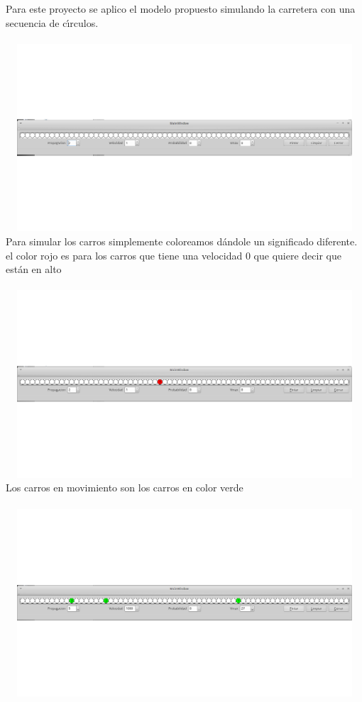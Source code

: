 \documentclass[a4paper,10pt]{article}
\begin{document}
Para este proyecto se aplico el modelo propuesto simulando la carretera con una secuencia de c\'\i rculos.
\\ \\
\includegraphics[width=15cm, height=7cm]{1}
\\
Para simular los carros simplemente coloreamos dándole un significado diferente. el color rojo es para los carros que tiene una velocidad 0 que quiere decir que est\'an en alto
\\ \\
\includegraphics[width=15cm, height=7cm]{2}
\\
Los carros en movimiento son los carros en color verde
\\ \\
\includegraphics[width=15cm, height=7cm]{3}
\\
\end{document}
